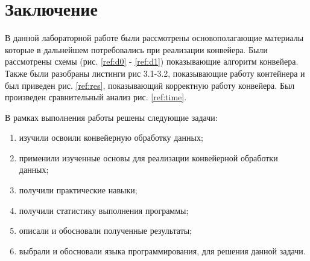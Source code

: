 \chapter*{Заключение}

В данной лабораторной работе были рассмотрены
основополагающие материалы которые в дальнейшем потребовались
при реализации конвейера.
Были рассмотрены схемы (рис. \ref{ref:d0} - \ref{ref:d1}) показывающие алгоритм конвейера.
Также были разобраны листинги рис 3.1-3.2,
показывающие работу контейнера и был приведен рис. \ref{ref:res},
показывающий корректную работу конвейера.
Был произведен сравнительный анализ рис. \ref{ref:time}.

В рамках выполнения работы решены следующие задачи:

\begin{enumerate}
	\item изучили освоили конвейерную обработку данных;
	\item применили изученные основы для реализации конвейерной обработки данных;
	\item получили практические навыки;
	\item получили статистику выполнения программы;
	\item описали и обосновали полученные результаты;
	\item выбрали и обосновали языка программирования, для решения данной задачи.
\end{enumerate}
